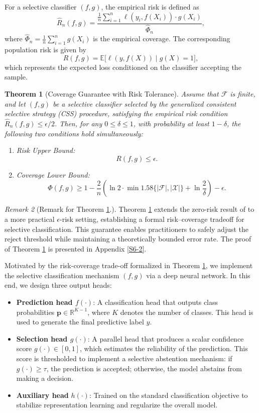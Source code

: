\documentclass[sigconf,review,anonymous]{acmart}
\newtheorem{theorem}{Theorem}[section]
\theoremstyle{remark}
\newtheorem{remark}[theorem]{Remark}
\begin{document}
For a selective classifier $(f,g)$, the empirical risk is defined as
\[
\hat{R}_n(f,g) = \frac{\frac{1}{n} \sum_{i=1}^n \ell(y_i, f(X_i)) \cdot g(X_i)}
{\hat{\Phi}_n},
\]
where $\hat{\Phi}_n = \frac{1}{n} \sum_{i=1}^n g(X_i)$ is the empirical coverage.
The corresponding population risk is given by
\[
R(f,g) = \mathbb{E}\bigl[\ell(y, f(X)) \mid g(X) = 1\bigr],
\]
which represents the expected loss conditioned on the classifier accepting the sample.
\begin{theorem}[Coverage Guarantee with Risk Tolerance]\label{Th2}
Assume that $\mathcal{F}$ is finite, and let $(f,g)$ be a selective classifier selected by the generalized consistent selective strategy (CSS) procedure, satisfying the empirical risk condition $\hat{R}_n(f,g) \leq \epsilon/2$. Then, for any $0 \leq \delta \leq 1$, with probability at least $1-\delta$, the following two conditions hold simultaneously:
\begin{enumerate}
    \item Risk Upper Bound: 
    \[R(f,g) \leq \epsilon.
    \]
    \item Coverage Lower Bound:
    \[
    \Phi(f,g) \geq 1 - \frac{2}{n} \left( \ln 2 \cdot \min1.58\{|\mathcal{F}|, |\mathcal{X}|\} + \ln \frac{2}{\delta} \right) - \epsilon.
    \]
\end{enumerate}
\end{theorem}
\begin{remark}[Remark for Theorem \ref{Th2}.]
Theorem \ref{Th2} extends the zero-risk result of \citep{el2010foundations} to a more practical $\epsilon$-risk setting, establishing a formal risk–coverage tradeoff for selective classification. This guarantee enables practitioners to safely adjust the reject threshold while maintaining a theoretically bounded error rate. The proof of Theorem \ref{Th2} is presented in Appendix \ref{S6-2}.
\end{remark}

Motivated by the risk-coverage trade-off formalized in Theorem \ref{Th2}, we implement the selective classification mechanism $(f,g)$ via a deep neural network. In this end, we design three output heads:

\begin{itemize}
\item \textbf{Prediction head $f(\cdot)$}: A classification head that outputs class probabilities $\mathbf{p} \in \mathbb{R}^{K-1}$, where $K$ denotes the number of classes. This head is used to generate the final predictive label $\hat{y}$.
\item \textbf{Selection head $g(\cdot)$}: A parallel head that produces a scalar confidence score $g(\cdot) \in [0,1]$, which estimates the reliability of the prediction. This score is thresholded to implement a selective abstention mechanism: if $g(\cdot) \ge \tau$, the prediction is accepted; otherwise, the model abstains from making a decision.
\item \textbf{Auxiliary head} $h(\cdot)$: Trained on the standard classification objective to stabilize representation learning and regularize the overall model.
\end{itemize}
\end{document}
